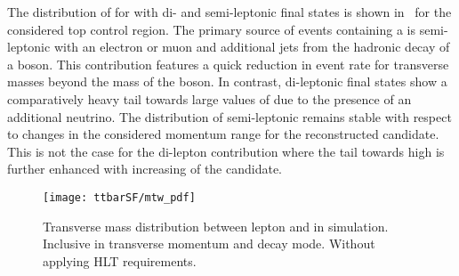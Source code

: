 The distribution of \mTW for \ttbar with di- and semi-leptonic final
states is shown in~ for the considered top
control region.
The primary source of events containing a \faketauhadvis is
semi-leptonic \ttbar with an electron or muon and additional jets from
the hadronic decay of a \PW boson. This contribution features a quick
reduction in event rate for transverse masses beyond the mass of the
\PW boson. In contrast, di-leptonic \ttbar final states show a
comparatively heavy tail towards large values of \mTW due to the
presence of an additional neutrino.  The \mTW distribution of
semi-leptonic \ttbar remains stable with respect to changes in the
considered momentum range for the reconstructed \tauhadvis
candidate. This is not the case for the di-lepton contribution where
the tail towards high \mTW is further enhanced with increasing \pT of
the \tauhadvis candidate.




\begin{figure}[htbp]
  \centering

  \texttt{[image: ttbarSF/mtw\_pdf]}

  \caption{Transverse mass distribution between lepton and \pTmiss in
    \ttbar simulation. Inclusive in \tauhadvis transverse momentum and
    decay mode. Without applying HLT requirements.}
  \label{fig:ttbarsf_mtw_pdf}
\end{figure}




